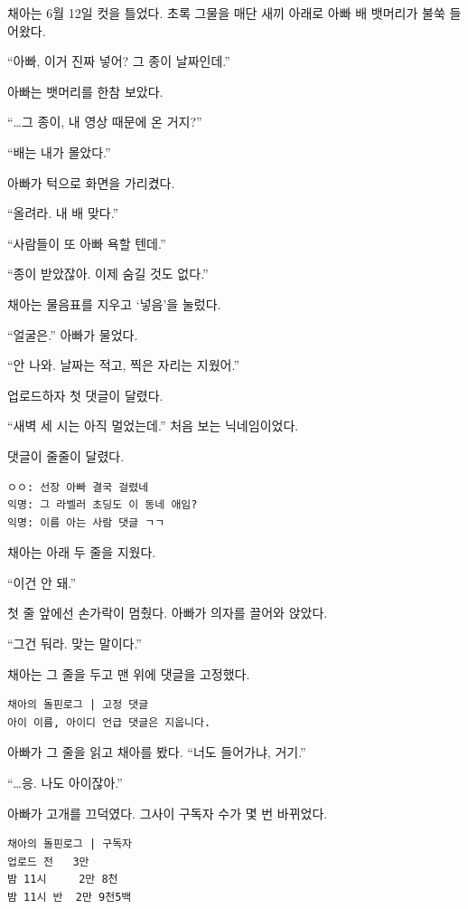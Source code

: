 \documentclass[
  korean,
  letterpaper,
  twoside,
  open=any,
  fontsize=12.5pt,
  headings=small]{scrbook}
\newcommand{\logfont}{\linespread{1}\fontsize{10.8}{15.2}\selectfont}
\newcommand{\dateline}[1]{\par\noindent{\sffamily\small\color{gray}#1}\par\medskip}
\begin{document}
채아는 6월 12일 컷을 틀었다.
초록 그물을 매단 새끼 아래로
아빠 배 뱃머리가 불쑥
들어왔다.

``아빠, 이거 진짜 넣어? 그
종이 날짜인데.''

아빠는 뱃머리를 한참 보았다.

``\ldots 그 종이, 내 영상
때문에 온 거지?''

``배는 내가 몰았다.''

아빠가 턱으로 화면을 가리켰다.

``올려라. 내 배 맞다.''

``사람들이 또 아빠 욕할
텐데.''

``종이 받았잖아. 이제 숨길
것도 없다.''

채아는 물음표를 지우고
`넣음'을 눌렀다.

``얼굴은.'' 아빠가 물었다.

``안 나와. 날짜는 적고, 찍은
자리는 지웠어.''

업로드하자 첫 댓글이 달렸다.

\dateline{새벽세시감귤: 원본 고마워요}

``새벽 세 시는 아직
멀었는데.'' 처음 보는
닉네임이었다.

댓글이 줄줄이 달렸다.

\begin{Verbatim}[samepage=true,frame=single,framesep=2.5mm,rulecolor=\color{gray},formatcom=\logfont]
ㅇㅇ: 선장 아빠 결국 걸렸네
익명: 그 라벨러 초딩도 이 동네 애임?
익명: 이름 아는 사람 댓글 ㄱㄱ
\end{Verbatim}

채아는 아래 두 줄을 지웠다.

``이건 안 돼.''

첫 줄 앞에선 손가락이 멈췄다.
아빠가 의자를 끌어와 앉았다.

``그건 둬라. 맞는 말이다.''

채아는 그 줄을 두고 맨 위에
댓글을 고정했다.

\begin{Verbatim}[samepage=true,frame=single,framesep=2.5mm,rulecolor=\color{gray},formatcom=\logfont]
채아의 돌핀로그 | 고정 댓글
아이 이름, 아이디 언급 댓글은 지웁니다.
\end{Verbatim}

아빠가 그 줄을 읽고 채아를
봤다. ``너도 들어가냐, 거기.''

``\ldots 응. 나도 아이잖아.''

아빠가 고개를 끄덕였다. 그사이
구독자 수가 몇 번 바뀌었다.

\begin{Verbatim}[samepage=true,frame=single,framesep=2.5mm,rulecolor=\color{gray},formatcom=\logfont]
채아의 돌핀로그 | 구독자
업로드 전   3만
밤 11시     2만 8천
밤 11시 반  2만 9천5백
\end{Verbatim}
\end{document}
